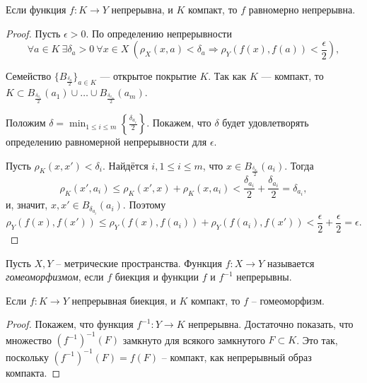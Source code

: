 \begin{theorem}[Кантор]
    Если функция $f: K \to Y$ непрерывна, и $K$ компакт, то $f$ равномерно непрерывна.
\end{theorem}

\begin{proof}
    Пусть $\epsilon > 0$. По определению непрерывности
    \[
        \forall a \in K \ \exists \delta_a > 0 \ \forall x \in X \ \left(\rho_X(x, a) < \delta_a \Rightarrow \rho_Y(f(x), f(a)) < \frac{\epsilon}{2}\right),
    \]

    Семейство $\{B_{\frac{\delta_a}{2}}\}_{a \in K}$ --- открытое покрытие $K$. Так как $K$ --- компакт, то $K \subset B_{\frac{\delta_{a_1}}{2}}(a_1) \cup \ldots \cup B_{\frac{\delta_{a_m}}{2}}(a_m)$.

    Положим $\delta = \min_{1 \le i \le m} \left\{\frac{\delta_{a_i}}{2}\right\}$. Покажем, что $\delta$ будет удовлетворять определению равномерной непрерывности для $\epsilon$.

    Пусть $\rho_K(x, x') < \delta_i$. Найдётся $i, 1 \le i \le m$, что $x \in B_{\frac{\delta_{a_i}}{2}}(a_i)$. Тогда
    \[
        \rho_K(x', a_i) \le \rho_K(x', x) + \rho_K(x, a_i) < \frac{\delta_{a_i}}{2} + \frac{\delta_{a_i}}{2} = \delta_{a_i},
    \]
    и, значит, $x, x' \in B_{\delta_{a_i}}(a_i)$. Поэтому
    \[
        \rho_Y(f(x), f(x')) \le \rho_Y(f(x), f(a_i)) + \rho_Y(f(a_i), f(x')) < \frac{\epsilon}{2} + \frac{\epsilon}{2} = \epsilon.
    \]
\end{proof}

\begin{definition}
    Пусть $X, Y$ -- метрические пространства. Функция $f: X \to Y$ называется \textit{гомеоморфизмом}, если $f$ биекция и функции $f$ и $f^{-1}$ непрерывны.
\end{definition}

\begin{theorem}
    Если $f: K \to Y$ непрерывная биекция, и $K$ компакт, то $f$ -- гомеоморфизм.
\end{theorem}

\begin{proof}
    Покажем, что функция $f^{-1}: Y \to K$ непрерывна. Достаточно показать, что множество $(f^{-1})^{-1}(F)$ замкнуто для всякого замкнутого $F \subset K$. Это так, поскольку $(f^{-1})^{-1}(F) = f(F)$ -- компакт, как непрерывный образ компакта.
\end{proof}